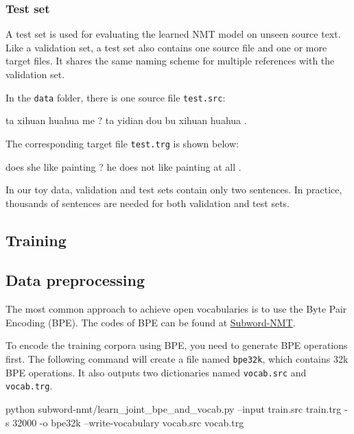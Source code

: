 \documentclass{article}
\begin{document}
\subsubsection{Test set}
A test set is used for evaluating the learned NMT model on unseen source text. Like a validation set, a test set also contains one source file and one or more target files. It shares the same naming scheme for multiple references with the validation set.

In the \verb|data| folder, there is one source file \verb|test.src|:
\begin{everbatim}
ta xihuan huahua me ?
ta yidian dou bu xihuan huahua .
\end{everbatim}

The corresponding target file \verb|test.trg| is shown below:
\begin{everbatim}
does she like painting ?
he does not like painting at all .
\end{everbatim}

In our toy data, validation and test sets contain only two sentences. In practice, thousands of sentences are needed for both validation and test sets.

\subsection{Training}

\subsection{Data preprocessing}
The most common approach to achieve open vocabularies is to use the Byte Pair Encoding (BPE). The codes of BPE can be found at \href{https://github.com/rsennrich/subword-nmt}{Subword-NMT}.

To encode the training corpora using BPE, you need to generate BPE operations first. The following command will create a file named \verb|bpe32k|, which contains 32k BPE operations. It also outputs two dictionaries named \verb|vocab.src| and \verb|vocab.trg|.
\begin{everbatim}
python subword-nmt/learn_joint_bpe_and_vocab.py 
  --input train.src train.trg -s 32000 -o bpe32k 
  --write-vocabulary vocab.src vocab.trg
\end{everbatim}
\end{document}
